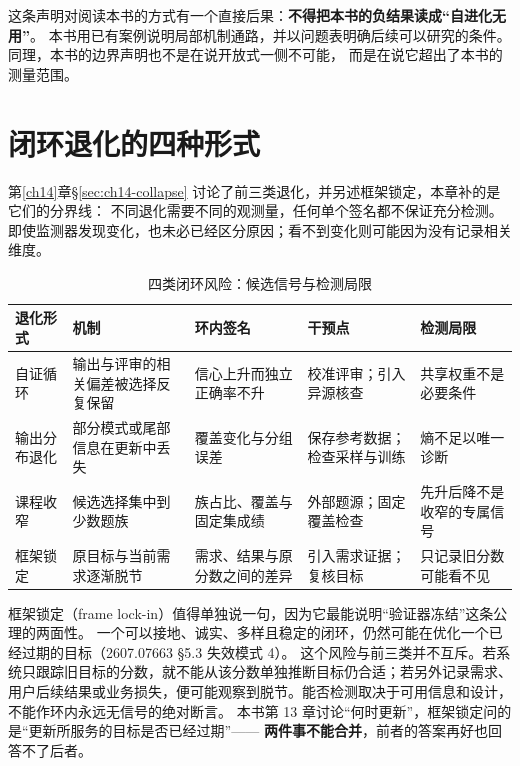 \begin{sloppypar}
这条声明对阅读本书的方式有一个直接后果：\textbf{不得把本书的负结果读成“自进化无用”}。
本书用已有案例说明局部机制通路，并以问题表明确后续可以研究的条件。同理，本书的边界声明也不是在说开放式一侧不可能，
而是在说它超出了本书的测量范围。
\end{sloppypar}

\section{闭环退化的四种形式}
\label{sec:ch16-collapse}

\begin{sloppypar}
第\ref{ch14}章\S\ref{sec:ch14-collapse} 讨论了前三类退化，并另述框架锁定，本章补的是它们的分界线：
不同退化需要不同的观测量，任何单个签名都不保证充分检测。即使监测器发现变化，也未必已经区分原因；看不到变化则可能因为没有记录相关维度。
\end{sloppypar}

\begin{table}[htbp]
\centering
\caption{四类闭环风险：候选信号与检测局限}
\label{tab:ch16-collapse}
\begin{footnotesize}
\begin{tabular}{>{\raggedright\arraybackslash}p{2.2cm}>{\raggedright\arraybackslash}p{3.4cm}>{\raggedright\arraybackslash}p{3.0cm}>{\raggedright\arraybackslash}p{2.6cm}>{\raggedright\arraybackslash}p{2.2cm}}
\toprule
退化形式 & 机制 & 环内签名 & 干预点 & 检测局限 \\
\midrule
自证循环 & 输出与评审的相关偏差被选择反复保留 & 信心上升而独立正确率不升 & 校准评审；引入异源核查 & 共享权重不是必要条件 \\
\midrule
输出分布退化 & 部分模式或尾部信息在更新中丢失 & 覆盖变化与分组误差 & 保存参考数据；检查采样与训练 & 熵不足以唯一诊断 \\
\midrule
课程收窄 & 候选选择集中到少数题族 & 族占比、覆盖与固定集成绩 & 外部题源；固定覆盖检查 & 先升后降不是收窄的专属信号 \\
\midrule
框架锁定 & 原目标与当前需求逐渐脱节 & 需求、结果与原分数之间的差异 & 引入需求证据；复核目标 & 只记录旧分数可能看不见 \\
\bottomrule
\end{tabular}
\end{footnotesize}
\end{table}

\begin{sloppypar}
框架锁定（frame lock-in）值得单独说一句，因为它最能说明“验证器冻结”这条公理的两面性。
一个可以接地、诚实、多样且稳定的闭环，仍然可能在优化一个已经过期的目标（2607.07663 §5.3 失效模式 4）\cite{rsi-survey-2607}。
这个风险与前三类并不互斥。若系统只跟踪旧目标的分数，就不能从该分数单独推断目标仍合适；若另外记录需求、用户后续结果或业务损失，便可能观察到脱节。能否检测取决于可用信息和设计，不能作环内永远无信号的绝对断言。
本书第 13 章讨论“何时更新”，框架锁定问的是“更新所服务的目标是否已经过期”——
\textbf{两件事不能合并}，前者的答案再好也回答不了后者。
\end{sloppypar}

